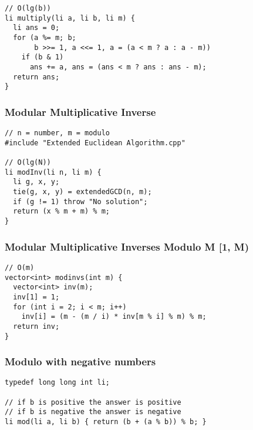 \documentclass[twoside]{article}
\begin{document}
\begin{multicols*}{2}
\begin{verbatim}
// O(lg(b))
li multiply(li a, li b, li m) {
  li ans = 0;
  for (a %= m; b;
       b >>= 1, a <<= 1, a = (a < m ? a : a - m))
    if (b & 1)
      ans += a, ans = (ans < m ? ans : ans - m);
  return ans;
}
\end{verbatim}

\subsubsectionfont{\large\bfseries\sffamily\underline}
\subsubsection*{Modular Multiplicative Inverse}
\begin{verbatim}
// n = number, m = modulo
#include "Extended Euclidean Algorithm.cpp"

// O(lg(N))
li modInv(li n, li m) {
  li g, x, y;
  tie(g, x, y) = extendedGCD(n, m);
  if (g != 1) throw "No solution";
  return (x % m + m) % m;
}
\end{verbatim}

\subsubsectionfont{\large\bfseries\sffamily\underline}
\subsubsection*{Modular Multiplicative Inverses Modulo M [1, M)}
\addcontentsline{toc}{subsubsection}{Modular Multiplicative Inverses Modulo M [1, M)}
\begin{verbatim}
// O(m)
vector<int> modinvs(int m) {
  vector<int> inv(m);
  inv[1] = 1;
  for (int i = 2; i < m; i++)
    inv[i] = (m - (m / i) * inv[m % i] % m) % m;
  return inv;
}
\end{verbatim}

\subsubsectionfont{\large\bfseries\sffamily\underline}
\subsubsection*{Modulo with negative numbers}
\begin{verbatim}
typedef long long int li;

// if b is positive the answer is positive
// if b is negative the answer is negative
li mod(li a, li b) { return (b + (a % b)) % b; }
\end{verbatim}

\subsectionfont{\bfseries\sffamily\centering\LARGE}
\vspace{0em}

\end{multicols*}
\end{document}
